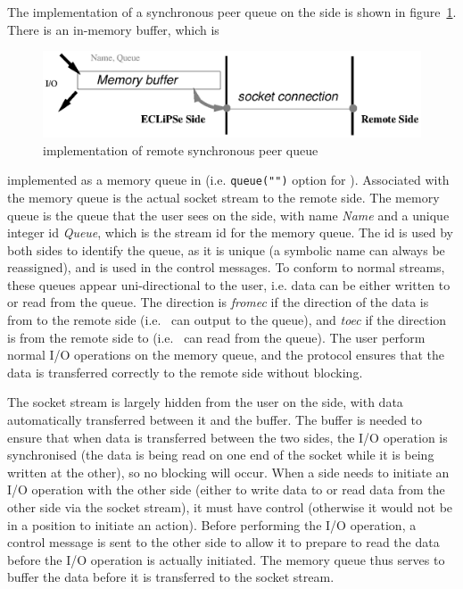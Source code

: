 The implementation of a synchronous peer queue on the {\eclipse} side is
shown in figure~\ref{syncpeer}. There is an in-memory buffer, which is
\begin{figure}[hbt]
\begin{center}
\includegraphics{syncpeer.ps}
\end{center}
\caption{{\eclipse} implementation of remote synchronous peer queue}
\label{syncpeer}
\end{figure}
implemented as a memory queue in {\eclipse} (i.e. {\tt queue("")} option
for ). Associated with the memory queue is the actual socket
stream to the remote side.
The memory queue is the queue that the user sees on the {\eclipse}
side, with name {\it Name} and a unique integer id {\it Queue}, which is
the stream id for the memory queue. The id is used by both sides to identify
the queue, as it is unique (a symbolic name can always be reassigned), and
is used in the control messages. To conform to normal {\eclipse} streams,
these queues appear uni-directional to the user, i.e. data can be either
written to or read from the queue. The direction is {\it fromec} if the
direction of the data is from {\eclipse} to the remote side (i.e.\ 
{\eclipse} can output to the queue), and {\it toec}
if the direction is from the remote side to {\eclipse} (i.e.\ {\eclipse}
can read from the queue). The user perform normal I/O operations on the
memory queue, and the protocol ensures that the data is transferred
correctly to the remote side without blocking.

The socket stream is largely hidden from the user on the {\eclipse} side,
with data automatically transferred between it and the buffer. The buffer
is needed to ensure that when data is transferred between the two sides,
the I/O operation is synchronised (the data is being read on one end of the
socket while it is being written at the other), so no blocking will occur.
When a side needs to initiate an I/O operation with the other side (either
to write data to or read data from the other side via the socket stream), it must have control
(otherwise it would not be in a position to initiate an action). Before
performing the I/O operation, a control message is sent to the other side to
allow it to prepare to read the data before the I/O operation is actually
initiated. The memory queue thus serves to buffer the data before it is
transferred to the socket stream.

